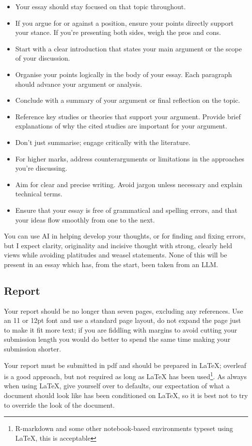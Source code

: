 \documentclass[12pt]{article}
\begin{document}
\begin{itemize}
\item Your essay should stay focused on that topic throughout. 
\item If you argue for or against a position, ensure your points directly support your stance. If you're presenting both sides, weigh the pros and cons.
\item Start with a clear introduction that states your main argument or the scope of your discussion.
\item Organise your points logically in the body of your essay. Each paragraph should advance your argument or analysis.
\item Conclude with a summary of your argument or final reflection on the topic.
\item Reference key studies or theories that support your argument. Provide brief explanations of why the cited studies are important for your argument.
\item  Don't just summarise; engage critically with the literature.
\item For higher marks, address counterarguments or limitations in the approaches you're discussing.
\item Aim for clear and precise writing. Avoid jargon unless necessary and explain technical terms.
\item Ensure that your essay is free of grammatical and spelling errors, and that your ideas flow smoothly from one to the next.
\end{itemize}

You can use AI in helping develop your thoughts, or for finding and
fixing errors, but I expect clarity, originality and incisive thought
with strong, clearly held views while avoiding platitudes and weasel
statements. None of this will be present in an essay which has, from
the start, been taken from an LLM.


\subsection*{Report}

Your report should be no longer than seven pages, excluding any
references. Use an 11 or 12pt font and use a standard page layout, do
not expand the page just to make it fit more text; if you are fiddling
with margins to avoid cutting your submission length you would do
better to spend the same time making your submission shorter.

Your report must be submitted in pdf and should be prepared in LaTeX;
overleaf is a good approach, but not required as long as LaTeX has
been used\footnote{R-markdown and some other notebook-based
environments typeset using LaTeX, this is acceptable}. As always when
using LaTeX, give yourself over to defaults, our expectation of what a
document should look like has been conditioned on LaTeX, so it is best
not to try to override the look of the document.
\end{document}
